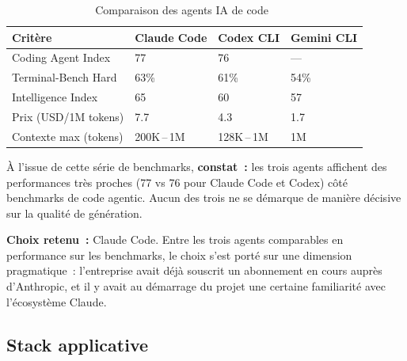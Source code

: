\begin{table}[H]
  \centering
  \renewcommand{\arraystretch}{1.4}
  \begin{tabular}{p{3.5cm} p{3cm} p{3cm} p{3cm}}
    \toprule
    \rowcolor{gray!20}
    \textbf{Critère} & \textbf{Claude Code} & \textbf{Codex CLI} & \textbf{Gemini CLI} \\
    \midrule
    \rowcolor{gray!5}
    Coding Agent Index  & 77              & 76                & — \\
    Terminal-Bench Hard & 63\%            & 61\%              & 54\% \\
    \rowcolor{gray!5}
    Intelligence Index  & 65              & 60                & 57 \\
    Prix (USD/1M tokens) & 7.7            & 4.3               & 1.7 \\
    \rowcolor{gray!5}
    Contexte max (tokens) & 200K\,--\,1M  & 128K\,--\,1M      & 1M \\
    \bottomrule
  \end{tabular}
  \caption{Comparaison des agents IA de code~\cite{artificial-analysis}}
  \label{tab:benchmark-ia}
\end{table}

À l'issue de cette série de benchmarks, \textbf{constat~:} les trois agents affichent des performances très proches (77 vs 76 pour Claude Code et Codex) côté benchmarks de code agentic. Aucun des trois ne se démarque de manière décisive sur la qualité de génération.

\textbf{Choix retenu~:} Claude Code. Entre les trois agents comparables en performance sur les benchmarks, le choix s'est porté sur une dimension pragmatique~: l'entreprise avait déjà souscrit un abonnement en cours auprès d'Anthropic, et il y avait au démarrage du projet une certaine familiarité avec l'écosystème Claude.

\subsection{Stack applicative}

